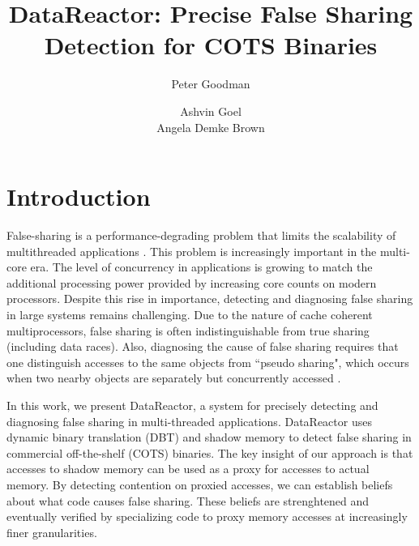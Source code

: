 \documentclass{sig-alternate}
\newcommand{\Toolname}{DataReactor}
\begin{document}
\title{\Large \bf \Toolname: Precise False Sharing Detection for COTS Binaries}
\author{
\alignauthor
Peter Goodman\\
\and
\alignauthor
Ashvin Goel\\
\alignauthor
Angela Demke Brown\\
}
\maketitle


\section{Introduction}\label{sec:intro}


False-sharing is a performance-degrading problem that limits the scalability of multithreaded applications
\cite{ImpactOfFalseSharing}. This problem is increasingly important in the multi-core era. The level of
concurrency in applications is growing to match the additional processing power provided by increasing
core counts on modern processors. Despite this rise in importance, detecting and diagnosing false
sharing in large systems remains challenging. Due to the nature of cache coherent multiprocessors, false
sharing is often indistinguishable from true sharing (including data races). Also, diagnosing the cause
of false sharing requires that one distinguish accesses to the same objects from ``pseudo sharing", which
occurs when two nearby objects are separately but concurrently accessed \cite{DegenerateSharingAndFalseCoherence}.

In this work, we present \Toolname{}, a system for precisely detecting and diagnosing false sharing
in multi-threaded applications. \Toolname{} uses dynamic binary translation (DBT) and shadow memory
to detect false sharing in commercial off-the-shelf (COTS) binaries.  The key insight of our
approach is that accesses to shadow memory can be used as a proxy for accesses to actual memory. By 
detecting contention on proxied accesses, we can establish beliefs about what code causes false sharing. These
beliefs are strenghtened and eventually verified by specializing code to proxy memory accesses at increasingly
finer granularities.
\end{document}
